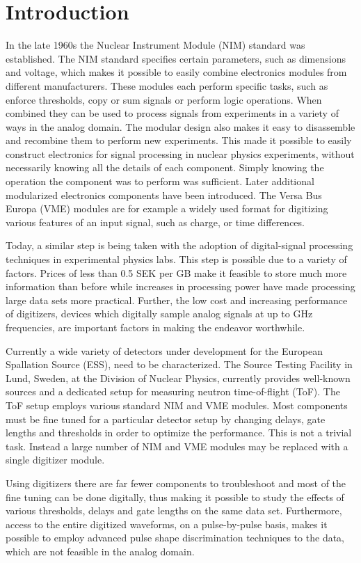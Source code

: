 \documentclass[main.tex]{subfiles}
\begin{document}
\chapter{Introduction}\label{ch:1}
In the late 1960s the Nuclear Instrument Module (NIM) standard was established. The NIM standard specifies certain parameters, such as dimensions and voltage, which makes it possible to easily combine electronics modules from different manufacturers. These modules each perform specific tasks, such as enforce thresholds, copy or sum signals or perform logic operations. When combined they can be used to process signals from experiments in a variety of ways in the analog domain. The modular design also makes it easy to disassemble and recombine them to perform new experiments. This made it possible to easily construct electronics for signal processing in nuclear physics experiments, without necessarily knowing all the details of each component. Simply knowing the operation the component was to perform was sufficient. Later additional modularized electronics components have been introduced. The Versa Bus Europa (VME) modules are for example a widely used format for digitizing various features of an input signal, such as charge, or time differences.

Today, a similar step is being taken with the adoption of digital-signal processing techniques in experimental physics labs. This step is possible due to a variety of factors. Prices of less than 0.5 SEK per GB make it feasible to store much more information than before while increases in processing power have made processing large data sets more practical. Further, the low cost and increasing performance of digitizers, devices which digitally sample analog signals at up to GHz frequencies, are important factors in making the endeavor worthwhile.

Currently a wide variety of detectors under development for the European Spallation Source (ESS), need to be characterized. The Source Testing Facility in Lund, Sweden, at the Division of Nuclear Physics, currently provides well-known sources and a dedicated setup for measuring neutron time-of-flight (ToF). The ToF setup employs various standard NIM and VME modules. Most components must be fine tuned for a particular detector setup by changing delays, gate lengths and thresholds in order to optimize the performance. This is not a trivial task. Instead a large number of NIM and VME modules may be replaced with a single digitizer module.

Using digitizers there are far fewer components to troubleshoot and most of the fine tuning can be done digitally, thus making it possible to study the effects of various thresholds, delays and gate lengths on the same data set. Furthermore, access to the entire digitized waveforms, on a pulse-by-pulse basis, makes it possible to employ advanced pulse shape discrimination techniques to the data, which are not feasible in the analog domain.
\end{document}
